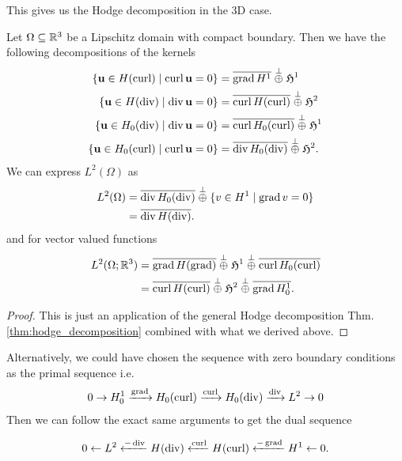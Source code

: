 \documentclass[../master_thesis.tex]{subfiles}
\begin{document}
This gives us the Hodge decomposition in the 3D case.

\begin{theorem}\label{thm:hodge_decomposition_in_3d}
    Let $\Omega \subseteq \mathbb{R}^3$ be a Lipschitz domain with compact boundary. Then we have the 
    following decompositions of the kernels
    \begin{align*}
        \{ \mathbf{u} \in H(\operatorname{curl}) \mid \operatorname{curl} \mathbf{u} = 0\}
        &= \overline{\operatorname{grad} H^1} \stackrel{\perp}{\oplus} 
            \mathfrak{H}^1
        \\ \{ \mathbf{u} \in H(\operatorname{div}) \mid \operatorname{div} \mathbf{u} = 0\}
        &= \overline{\operatorname{curl} H(\operatorname{curl})} \stackrel{\perp}{\oplus} 
            \mathfrak{H}^2
        \\ \{ \mathbf{u} \in H_0(\operatorname{div}) \mid \operatorname{div} \mathbf{u} = 0\}
        &= \overline{\operatorname{curl} H_0(\operatorname{curl})} \stackrel{\perp}{\oplus} 
            \mathfrak{H}^1
        \\ \{ \mathbf{u} \in H_0(\operatorname{curl}) \mid \operatorname{curl} \mathbf{u} = 0\}
        &= \overline{\operatorname{div} H_0(\operatorname{div})} \stackrel{\perp}{\oplus} 
            \mathfrak{H}^2.
    \end{align*}
    We can express $L^2(\Omega)$ as
    \begin{align*}
        L^2(\Omega) &= \overline{\operatorname{div} H_0(\operatorname{div})} \stackrel{\perp}{\oplus} 
            \{ v \in H^1 \mid \operatorname{grad} v = 0 \}
        \\ &= \overline{\operatorname{div} H(\operatorname{div})}.
    \end{align*}
    and for vector valued functions
    \begin{align*}
        L^2(\Omega;\mathbb{R}^3) &= \overline{\operatorname{grad} H(\operatorname{grad})} 
            \stackrel{\perp}{\oplus} \mathfrak{H}^1 
            \stackrel{\perp}{\oplus} \overline{\operatorname{curl} H_0(\operatorname{curl})} 
        \\ &= \overline{\operatorname{curl} H(\operatorname{curl})}
            \stackrel{\perp}{\oplus} \mathfrak{H}^2
            \stackrel{\perp}{\oplus} \overline{\operatorname{grad} H^1_0}.
    \end{align*}
\end{theorem}
\begin{proof}
    This is just an application of the general Hodge decomposition 
    Thm.\,\ref{thm:hodge_decomposition} combined with what we derived above.
\end{proof}


\begin{remark}
    Alternatively, we could have chosen the sequence with zero boundary conditions
    as the primal sequence i.e. 
    \begin{align*}
        0 \rightarrow H^1_0 \xrightarrow{\operatorname{grad}} H_0(\operatorname{curl})
        \xrightarrow{\operatorname{curl}} H_0(\operatorname{div}) 
        \xrightarrow{\operatorname{div}} L^2 \rightarrow 0
    \end{align*}
    Then we can follow the exact same arguments to get the dual sequence 

    \begin{align*}
        0 \leftarrow L^2 \xleftarrow{-\operatorname{div}} H(\operatorname{div})
            \xleftarrow{\operatorname{curl}} H(\operatorname{curl}) 
            \xleftarrow{-\operatorname{grad}} H^1 \leftarrow 0.
    \end{align*}
\end{remark}
\end{document}
